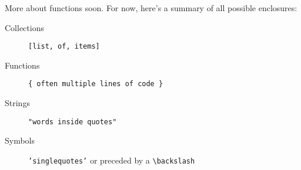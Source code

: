 More about functions soon. For now, here's a summary of all possible enclosures:
\begin{description}
\item[Collections] \texttt{[list, of, items]}
\item[Functions] \texttt{\{ often multiple lines of code \}}
\item[Strings] \texttt{"words inside quotes"}
\item[Symbols] \texttt{'singlequotes'} or preceded by a \texttt{\textbackslash backslash}
\end{description}